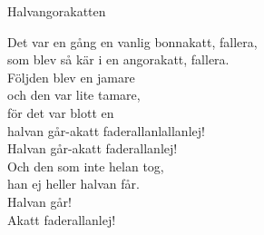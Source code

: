 \begin{song}{Halvangorakatten}
	
	
	
	
	Det var en gång en vanlig bonnakatt, fallera,\\
	som blev så kär i en angorakatt, fallera.\\
	Följden blev en jamare\\
	och den var lite tamare,\\
	för det var blott en\\
	halvan går-akatt faderallanlallanlej!\\
	Halvan går-akatt faderallanlej!\\
	Och den som inte helan tog,\\
	han ej heller halvan får.\\
	Halvan går!\\
	Akatt faderallanlej!
	
\end{song}
